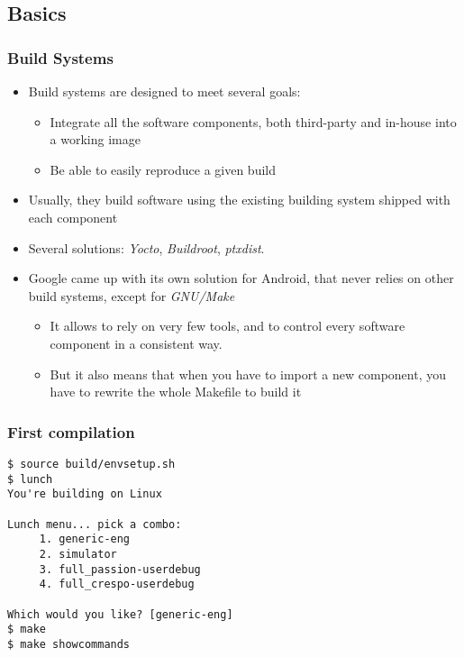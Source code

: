 \subsection{Basics}
\begin{frame}
  \frametitle{Build Systems}
  \begin{itemize}
  \item Build systems are designed to meet several goals:
    \begin{itemize}
    \item Integrate all the software components, both third-party and
      in-house into a working image
    \item Be able to easily reproduce a given build
    \end{itemize}
  \item Usually, they build software using the existing building system shipped with
    each component
  \item Several solutions: \emph{Yocto}, \emph{Buildroot},
    \emph{ptxdist}.
  \item Google came up with its own solution for Android, that never relies on
    other build systems, except for \emph{GNU/Make}
    \begin{itemize}
    \item It allows to rely on very few tools, and to
      control every software component in a consistent way.
    \item But it also means that when you have to import a new
      component, you have to rewrite the whole Makefile to build it
    \end{itemize}
  \end{itemize}
\end{frame}

\begin{frame}[fragile]
  \frametitle{First compilation}
\begin{verbatim}
$ source build/envsetup.sh
$ lunch
You're building on Linux

Lunch menu... pick a combo:
     1. generic-eng
     2. simulator
     3. full_passion-userdebug
     4. full_crespo-userdebug

Which would you like? [generic-eng]
$ make
$ make showcommands
\end{verbatim}
\end{frame}

